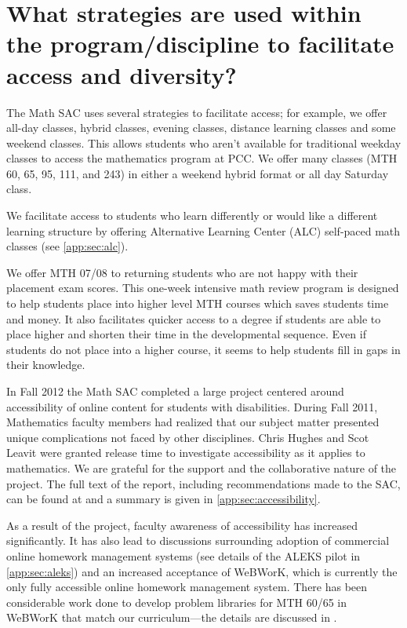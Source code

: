 \section[Strategies to facilitate access and diversity]{What strategies are
  used within the program/discipline to facilitate access and
  diversity?}\label{needs:sec:access}
The Math SAC uses several strategies to facilitate access; for example, we offer all-day classes, hybrid classes, evening classes, distance learning classes and some weekend classes.
This allows students who aren't available for traditional weekday classes to access the mathematics program at PCC.
We offer many classes (MTH 60, 65, 95, 111, and 243) in either a weekend hybrid format or all day Saturday class.

We facilitate access to students who learn differently or would like a different learning structure by offering  Alternative Learning Center (ALC) self-paced math classes (see \vref{app:sec:alc}).

We offer MTH 07/08  to returning students who are not happy with their placement exam scores.
This one-week intensive math review program is designed to help students place into higher level MTH courses which saves students time and money.
It also facilitates quicker access to a degree if students are able to place higher and shorten their time in the developmental sequence.
Even if students do not place into a higher course, it seems to help students fill in gaps in their knowledge.

In Fall 2012 the Math SAC completed a large project centered around accessibility of online content for students with disabilities.
During Fall 2011, Mathematics faculty members had realized that our subject matter presented unique complications not faced by other disciplines.
Chris Hughes and Scot Leavit were granted release time to investigate accessibility as it applies to mathematics.
We are grateful for the support and the collaborative nature of the project.
\label{needs:page:disabilityservices}
The full text of the report, including recommendations made to the SAC, can be found at \cite{accessibilityproject} and a summary is given in \vref{app:sec:accessibility}.

As a result of the project, faculty awareness of accessibility has increased significantly.
It has also lead to discussions surrounding adoption of commercial online homework management systems (see details of the ALEKS pilot in \vref{app:sec:aleks}) and an increased acceptance of WeBWorK, which is currently the only fully accessible online homework management system.
There has been considerable work done to develop problem libraries for MTH 60/65 in WeBWorK that match our curriculum---the details are discussed in .

